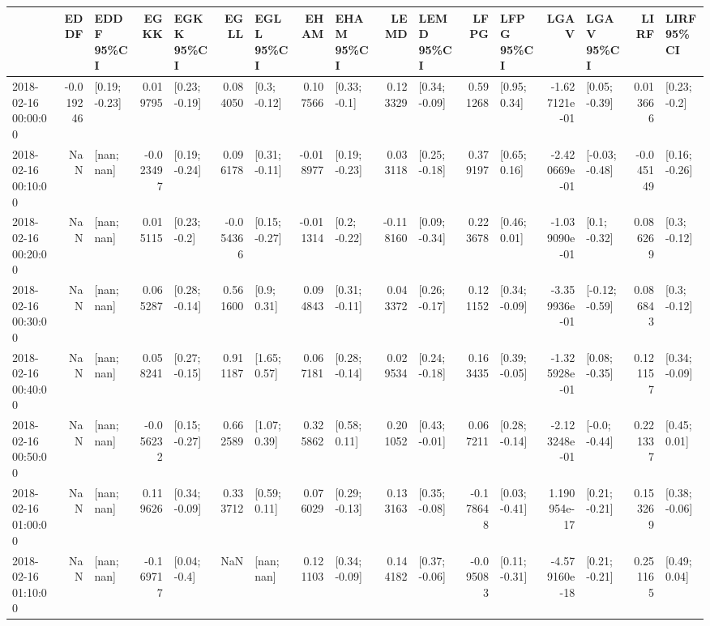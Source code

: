 \begin{tabular}{lrlrlrlrlrlrlrlrl}
\toprule
{} &      EDDF &      EDDF 95\%CI &      EGKK &      EGKK 95\%CI &      EGLL &      EGLL 95\%CI &      EHAM &      EHAM 95\%CI &      LEMD &      LEMD 95\%CI &      LFPG &      LFPG 95\%CI &          LGAV &      LGAV 95\%CI &      LIRF &      LIRF 95\%CI \\
\midrule
2018-02-16 00:00:00 & -0.019246 &   [0.19; -0.23] &  0.019795 &   [0.23; -0.19] &  0.084050 &    [0.3; -0.12] &  0.107566 &    [0.33; -0.1] &  0.123329 &   [0.34; -0.09] &  0.591268 &    [0.95; 0.34] & -1.627121e-01 &   [0.05; -0.39] &  0.013666 &    [0.23; -0.2] \\
2018-02-16 00:10:00 &       NaN &      [nan; nan] & -0.023497 &   [0.19; -0.24] &  0.096178 &   [0.31; -0.11] & -0.018977 &   [0.19; -0.23] &  0.033118 &   [0.25; -0.18] &  0.379197 &    [0.65; 0.16] & -2.420669e-01 &  [-0.03; -0.48] & -0.045149 &   [0.16; -0.26] \\
2018-02-16 00:20:00 &       NaN &      [nan; nan] &  0.015115 &    [0.23; -0.2] & -0.054366 &   [0.15; -0.27] & -0.011314 &    [0.2; -0.22] & -0.118160 &   [0.09; -0.34] &  0.223678 &    [0.46; 0.01] & -1.039090e-01 &    [0.1; -0.32] &  0.086269 &    [0.3; -0.12] \\
2018-02-16 00:30:00 &       NaN &      [nan; nan] &  0.065287 &   [0.28; -0.14] &  0.561600 &     [0.9; 0.31] &  0.094843 &   [0.31; -0.11] &  0.043372 &   [0.26; -0.17] &  0.121152 &   [0.34; -0.09] & -3.359936e-01 &  [-0.12; -0.59] &  0.086843 &    [0.3; -0.12] \\
2018-02-16 00:40:00 &       NaN &      [nan; nan] &  0.058241 &   [0.27; -0.15] &  0.911187 &    [1.65; 0.57] &  0.067181 &   [0.28; -0.14] &  0.029534 &   [0.24; -0.18] &  0.163435 &   [0.39; -0.05] & -1.325928e-01 &   [0.08; -0.35] &  0.121157 &   [0.34; -0.09] \\
2018-02-16 00:50:00 &       NaN &      [nan; nan] & -0.056232 &   [0.15; -0.27] &  0.662589 &    [1.07; 0.39] &  0.325862 &    [0.58; 0.11] &  0.201052 &   [0.43; -0.01] &  0.067211 &   [0.28; -0.14] & -2.123248e-01 &   [-0.0; -0.44] &  0.221337 &    [0.45; 0.01] \\
2018-02-16 01:00:00 &       NaN &      [nan; nan] &  0.119626 &   [0.34; -0.09] &  0.333712 &    [0.59; 0.11] &  0.076029 &   [0.29; -0.13] &  0.133163 &   [0.35; -0.08] & -0.178648 &   [0.03; -0.41] &  1.190954e-17 &   [0.21; -0.21] &  0.153269 &   [0.38; -0.06] \\
2018-02-16 01:10:00 &       NaN &      [nan; nan] & -0.169717 &    [0.04; -0.4] &       NaN &      [nan; nan] &  0.121103 &   [0.34; -0.09] &  0.144182 &   [0.37; -0.06] & -0.095083 &   [0.11; -0.31] & -4.579160e-18 &   [0.21; -0.21] &  0.251165 &    [0.49; 0.04] \\

\end{tabular}
